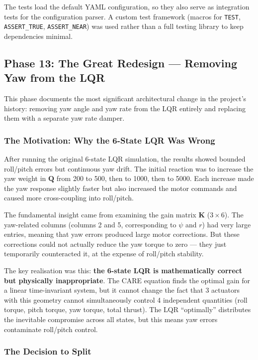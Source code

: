 \documentclass[12pt, a4paper]{article}
\newcommand{\bK}{\bm{K}}
\newcommand{\bQ}{\bm{Q}}
\begin{document}
The tests load the default YAML configuration, so they also serve as integration tests for the configuration parser.  A custom test framework (macros for \texttt{TEST}, \texttt{ASSERT\_TRUE}, \texttt{ASSERT\_NEAR}) was used rather than a full testing library to keep dependencies minimal.

\subsection{Phase 13: The Great Redesign --- Removing Yaw from the LQR}

This phase documents the most significant architectural change in the project's history: removing yaw angle and yaw rate from the LQR entirely and replacing them with a separate yaw rate damper.

\subsubsection{The Motivation: Why the 6-State LQR Was Wrong}

After running the original 6-state LQR simulation, the results showed bounded roll/pitch errors but continuous yaw drift.  The initial reaction was to increase the yaw weight in $\bQ$ from 200 to 500, then to 1000, then to 5000.  Each increase made the yaw response slightly faster but also increased the motor commands and caused more cross-coupling into roll/pitch.

The fundamental insight came from examining the gain matrix $\bK$ ($3 \times 6$).  The yaw-related columns (columns 2 and 5, corresponding to $\psi$ and $r$) had very large entries, meaning that yaw errors produced large motor corrections.  But these corrections could not actually reduce the yaw torque to zero --- they just temporarily counteracted it, at the expense of roll/pitch stability.

The key realisation was this: \textbf{the 6-state LQR is mathematically correct but physically inappropriate}.  The CARE equation finds the optimal gain for a linear time-invariant system, but it cannot change the fact that 3 actuators with this geometry cannot simultaneously control 4 independent quantities (roll torque, pitch torque, yaw torque, total thrust).  The LQR ``optimally'' distributes the inevitable compromise across all states, but this means yaw errors contaminate roll/pitch control.

\subsubsection{The Decision to Split}
\end{document}

